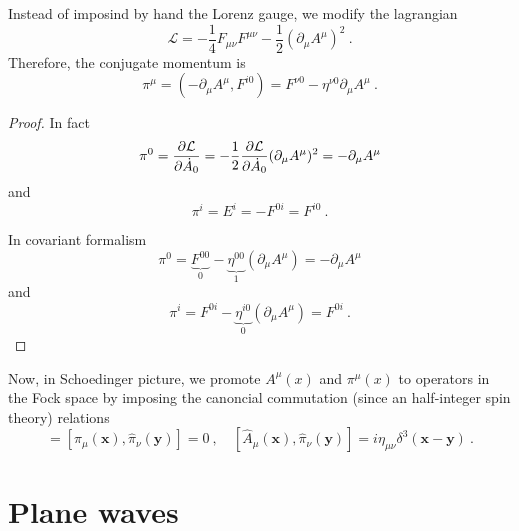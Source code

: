     Instead of imposind by hand the Lorenz gauge, we modify the lagrangian 
    \begin{equation*}
        \mathcal L = - \frac{1}{4} F_{\mu\nu} F^{\mu\nu} - \frac{1}{2} (\partial_\mu A^\mu)^2 ~. 
    \end{equation*}
    Therefore, the conjugate momentum is 
    \begin{equation*}
        \pi^\mu = (- \partial_\mu A^\mu, F^{i0}) = F^{\nu 0} - \eta^{\nu 0} \partial_\mu A^\mu ~.
    \end{equation*}
    \begin{proof}
        In fact 
        \begin{equation*}
            \pi^0 = \frac{\partial\mathcal L}{\partial\dot A_0} = - \frac{1}{2} \frac{\partial\mathcal L}{\partial\dot A_0} (\partial_\mu A^\mu)^2 = - \partial_\mu A^\mu 
        \end{equation*}
        and 
        \begin{equation*}
            \pi^i = E^i = - F^{0i} = F^{i0} ~.
        \end{equation*}

        In covariant formalism 
        \begin{equation*}
            \pi^0 = \underbrace{F^{00}}_0 - \underbrace{\eta^{00}}_1 (\partial_\mu A^\mu) = - \partial_\mu A^\mu 
        \end{equation*}
        and 
        \begin{equation*}
            \pi^i = F^{0i} - \underbrace{\eta^{i0}}_0 (\partial_\mu A^\mu) = F^{0i} ~.
        \end{equation*}
    \end{proof}

    Now, in Schoedinger picture, we promote $A^\mu(x)$ and $\pi^\mu(x)$ to operators in the Fock space by imposing the canoncial commutation (since an half-integer spin theory) relations 
    \begin{equation*}
        [\hat A_\mu (\mathbf x), \hat A_\nu (\mathbf y)] =[\hat \pi_\mu (\mathbf x), \hat \pi_\nu (\mathbf y)] = 0 ~, \quad [\hat A_\mu (\mathbf x), \hat \pi_\nu (\mathbf y)] = i \eta_{\mu\nu} \delta^3 (\mathbf x - \mathbf y) ~.
    \end{equation*}

\section{Plane waves} 

